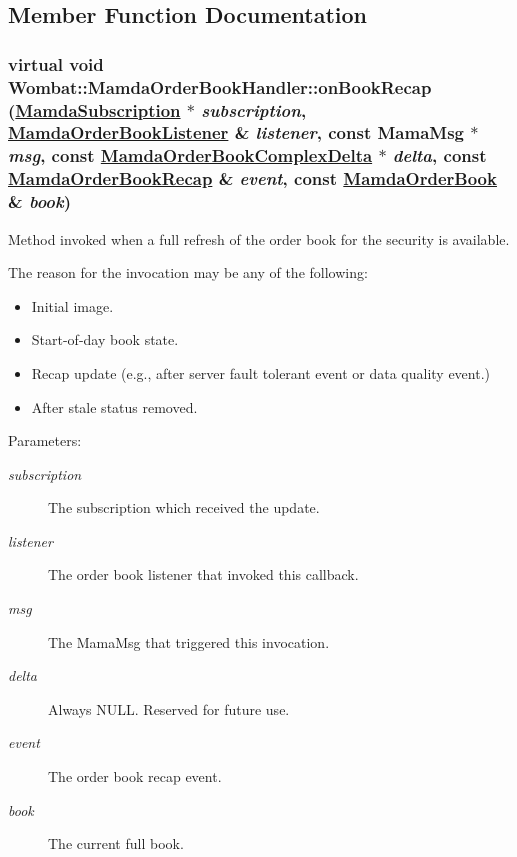 \subsection{Member Function Documentation}
\hypertarget{classWombat_1_1MamdaOrderBookHandler_2c353b638002894e89b98de5991f77ad}{
\subsubsection[onBookRecap]{\setlength{\rightskip}{0pt plus 5cm}virtual void Wombat::Mamda\-Order\-Book\-Handler::on\-Book\-Recap (\hyperlink{classWombat_1_1MamdaSubscription}{Mamda\-Subscription} $\ast$ {\em subscription}, \hyperlink{classWombat_1_1MamdaOrderBookListener}{Mamda\-Order\-Book\-Listener} \& {\em listener}, const Mama\-Msg $\ast$ {\em msg}, const \hyperlink{classWombat_1_1MamdaOrderBookComplexDelta}{Mamda\-Order\-Book\-Complex\-Delta} $\ast$ {\em delta}, const \hyperlink{classWombat_1_1MamdaOrderBookRecap}{Mamda\-Order\-Book\-Recap} \& {\em event}, const \hyperlink{classWombat_1_1MamdaOrderBook}{Mamda\-Order\-Book} \& {\em book})}}
\label{classWombat_1_1MamdaOrderBookHandler_2c353b638002894e89b98de5991f77ad}


Method invoked when a full refresh of the order book for the security is available. 

The reason for the invocation may be any of the following:\begin{itemize}
\item Initial image.\item Start-of-day book state.\item Recap update (e.g., after server fault tolerant event or data quality event.)\item After stale status removed.\end{itemize}


\begin{Desc}
\item[Parameters:]
\begin{description}
\item[{\em subscription}]The subscription which received the update. \item[{\em listener}]The order book listener that invoked this callback. \item[{\em msg}]The Mama\-Msg that triggered this invocation. \item[{\em delta}]Always NULL. Reserved for future use. \item[{\em event}]The order book recap event. \item[{\em book}]The current full book. \end{description}
\end{Desc}



